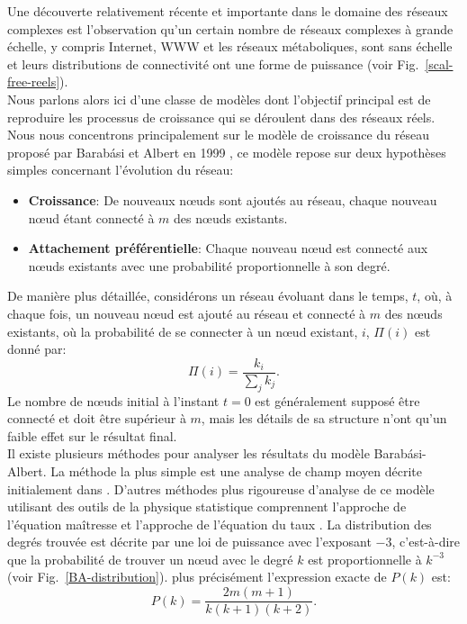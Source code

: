 Une découverte relativement récente et importante dans le domaine des réseaux complexes est l'observation qu'un certain nombre de réseaux complexes à grande échelle, y compris Internet, WWW et les réseaux métaboliques, sont sans échelle et leurs distributions de connectivité ont une forme de puissance (voir Fig.~\ref{scal-free-reels}).\\
Nous parlons alors ici d'une classe de modèles dont l'objectif principal est de reproduire les processus de croissance qui se déroulent dans des réseaux réels. Nous nous concentrons principalement sur le modèle de croissance du réseau proposé par Barabási et Albert en 1999 \cite{BA1999}, ce modèle repose sur deux hypothèses simples concernant l'évolution du réseau:
\begin{itemize}
	\item \textbf{Croissance}: De nouveaux nœuds sont ajoutés au réseau, chaque nouveau nœud étant connecté à $m$ des nœuds existants.
	\item \textbf{Attachement préférentielle}: Chaque nouveau nœud est connecté aux nœuds existants avec une probabilité proportionnelle à son degré.
\end{itemize}
De manière plus détaillée, considérons un réseau évoluant dans le temps, $t$, où, à chaque fois, un nouveau nœud est ajouté au réseau et connecté à $m$ des nœuds existants, où la probabilité de se connecter à un nœud existant,  $i$, $\Pi(i)$ est donné par:
\begin{equation}
\Pi(i)=\dfrac{k_i}{\sum_jk_j}.
\end{equation}
Le nombre de nœuds initial à l'instant $t=0$ est généralement supposé être connecté et doit être supérieur à $m$, mais les détails de sa structure n'ont qu'un faible effet sur le résultat final.\\

Il existe plusieurs méthodes pour analyser les résultats du modèle Barabási-Albert.
La méthode la plus simple est une analyse de champ moyen décrite initialement dans \cite{BA1999}.
D'autres méthodes plus rigoureuse d'analyse de ce modèle utilisant des outils de la physique statistique comprennent l'approche de l'équation maîtresse \cite{Dorogovtsev-al2000} et l'approche de l'équation du taux \cite{Krapivsky-al2000}. La distribution des degrés trouvée est décrite par une loi de puissance avec l'exposant $-3$, c'est-à-dire que la probabilité de trouver un nœud avec le degré $k$ est proportionnelle à $k^{-3}$ (voir Fig.~\ref{BA-distribution}). plus précisément l'expression exacte de $P(k)$ est:
\begin{equation}
 P(k)=\dfrac{2m(m+1)}{k(k+1)(k+2)}.
\label{pk-1}
\end{equation}

